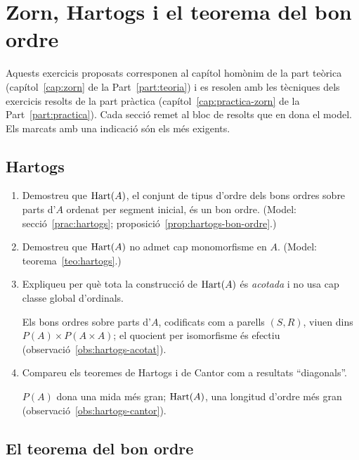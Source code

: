 \chapter{Zorn, Hartogs i el teorema del bon ordre}\label{cap:exercicis-zorn}

Aquests exercicis proposats corresponen al capítol homònim de la part teòrica (capítol~\ref{cap:zorn} de la Part~\ref{part:teoria}) i es resolen amb les tècniques dels exercicis resolts de la part pràctica (capítol~\ref{cap:practica-zorn} de la Part~\ref{part:practica}). Cada secció remet al bloc de resolts que en dona el model. Els marcats amb una indicació són els més exigents.

\section{Hartogs}

\begin{enumerate}
  \item Demostreu que \(\operatorname{Hart}(A)\), el conjunt de tipus d'ordre dels bons ordres sobre parts d'\(A\) ordenat per segment inicial, és un bon ordre. (Model: secció~\ref{prac:hartogs}; proposició~\ref{prop:hartogs-bon-ordre}.)

  \item Demostreu que \(\operatorname{Hart}(A)\) no admet cap monomorfisme en \(A\). (Model: teorema~\ref{teo:hartogs}.)

  \item Expliqueu per què tota la construcció de \(\operatorname{Hart}(A)\) és \emph{acotada} i no usa cap classe global d'ordinals. \begin{indicacio}Els bons ordres sobre parts d'\(A\), codificats com a parells \((S,R)\), viuen dins \(P(A)\times P(A\times A)\); el quocient per isomorfisme és efectiu (observació~\ref{obs:hartogs-acotat}).\end{indicacio}

  \item Compareu els teoremes de Hartogs i de Cantor com a resultats \enquote{diagonals}. \begin{indicacio}\(P(A)\) dona una mida més gran; \(\operatorname{Hart}(A)\), una longitud d'ordre més gran (observació~\ref{obs:hartogs-cantor}).\end{indicacio}
\end{enumerate}

\section{El teorema del bon ordre}

